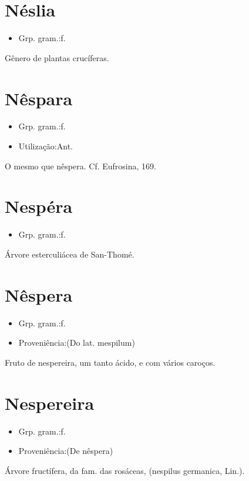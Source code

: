 \section{Néslia}
\begin{itemize}
\item {Grp. gram.:f.}
\end{itemize}
Gênero de plantas crucíferas.
\section{Nêspara}
\begin{itemize}
\item {Grp. gram.:f.}
\end{itemize}
\begin{itemize}
\item {Utilização:Ant.}
\end{itemize}
O mesmo que \textunderscore nêspera\textunderscore . Cf. \textunderscore Eufrosina\textunderscore , 169.
\section{Nespéra}
\begin{itemize}
\item {Grp. gram.:f.}
\end{itemize}
Árvore esterculiácea de San-Thomé.
\section{Nêspera}
\begin{itemize}
\item {Grp. gram.:f.}
\end{itemize}
\begin{itemize}
\item {Proveniência:(Do lat. \textunderscore mespilum\textunderscore )}
\end{itemize}
Fruto de nespereira, um tanto ácido, e com vários caroços.
\section{Nespereira}
\begin{itemize}
\item {Grp. gram.:f.}
\end{itemize}
\begin{itemize}
\item {Proveniência:(De \textunderscore nêspera\textunderscore )}
\end{itemize}
Árvore fructífera, da fam. das rosáceas, (\textunderscore nespilus germanica\textunderscore , Lin.).
